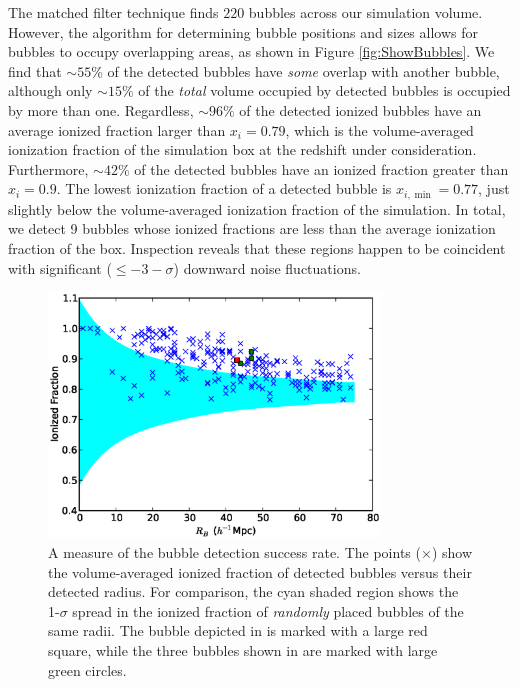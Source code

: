 The matched filter technique finds $220$ bubbles across our simulation
volume. However, the algorithm for determining bubble positions and sizes allows for bubbles to occupy overlapping areas, as shown in Figure \ref{fig:ShowBubbles}. We find that $\sim 55\%$ of the detected bubbles have \textit{some} overlap with another bubble, although only $\sim 15\%$ of the {\em total} volume occupied by detected bubbles is occupied by more than one.  
Regardless, $\sim 96\%$ of the detected ionized bubbles have an average ionized
fraction larger than $x_i = 0.79$, which is the volume-averaged ionization
fraction of the simulation box at the redshift under
consideration. Furthermore, $\sim 42\%$ of the detected bubbles have an
ionized fraction greater than $x_i = 0.9$. 
The lowest ionization fraction of a detected bubble is
$x_{i,\min} = 0.77$, just slightly
below the volume-averaged ionization fraction of the simulation. In
total, we detect 9 bubbles whose ionized fractions are less than the
average ionization fraction of the box. Inspection reveals that
these regions happen to be coincident with significant ($\leq -3-\sigma$) 
downward noise fluctuations. 

\begin{figure}[t]
  \centering 
   \includegraphics[width=8.8cm]{f9.eps}
  \caption{A measure of the bubble detection success rate. The points ($\times$) show 
    the volume-averaged ionized fraction of detected bubbles versus
    their detected radius. For comparison, the cyan shaded region shows the 1-$\sigma$ spread
in the ionized fraction of {\em randomly} placed bubbles of the same radii.
 The bubble 
depicted in  is
    marked with a large red square, while the three bubbles shown in
     are marked with large green circles.}
  \label{fig:success}
\end{figure}

